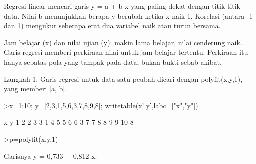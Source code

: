 \documentclass[a4paper,10pt]{article}
\begin{document}
\begin{eulernotebook}
\begin{eulercomment}
\begin{eulercomment}
\begin{eulercomment}
\begin{eulercomment}
\begin{eulercomment}
\begin{eulercomment}
\begin{eulercomment}
\begin{eulercomment}
\begin{eulercomment}
\begin{eulercomment}
\begin{eulercomment}
\begin{eulercomment}
\begin{eulercomment}
\begin{eulercomment}
\begin{eulerprompt}
\end{eulerprompt}
\begin{eulercomment}
\begin{eulercomment}
\begin{eulercomment}
\end{eulercomment}
\begin{eulercomment}
Regresi linear mencari garis y = a + b x yang paling dekat dengan titik-titik data. Nilai b
menunjukkan berapa y berubah ketika x naik 1. Korelasi (antara -1 dan 1) mengukur seberapa
erat dua variabel naik atau turun bersama.

\end{eulercomment}
\begin{eulercomment}
Jam belajar (x) dan nilai ujian (y): makin lama belajar, nilai cenderung naik. Garis regresi
memberi perkiraan nilai untuk jam belajar tertentu. Perkiraan itu hanya sebatas pola yang
tampak pada data, bukan bukti sebab-akibat.

\end{eulercomment}
\begin{eulercomment}
Langkah 1. Garis regresi untuk data satu peubah dicari dengan polyfit(x,y,1), yang memberi
[a, b].
\end{eulercomment}
\begin{eulerprompt}
>x=1:10; y=[2,3,1,5,6,3,7,8,9,8]; writetable(x'|y',labc=["x","y"])
\end{eulerprompt}
\begin{euleroutput}
           x         y
           1         2
           2         3
           3         1
           4         5
           5         6
           6         3
           7         7
           8         8
           9         9
          10         8
\end{euleroutput}
\begin{eulerprompt}
>p=polyfit(x,y,1)
\end{eulerprompt}
\begin{euleroutput}
  [0.73333,  0.81212]
\end{euleroutput}
\begin{eulercomment}
Garisnya y = 0,733 + 0,812 x.


\end{eulercomment}
\end{eulercomment}
\end{eulercomment}
\end{eulercomment}
\end{eulercomment}
\end{eulercomment}
\end{eulercomment}
\end{eulercomment}
\end{eulercomment}
\end{eulercomment}
\end{eulercomment}
\end{eulercomment}
\end{eulercomment}
\end{eulercomment}
\end{eulercomment}
\end{eulercomment}
\end{eulercomment}
\end{eulernotebook}
\end{document}
